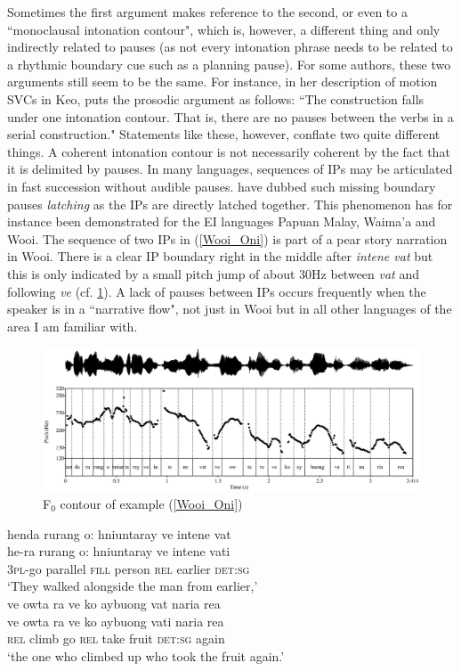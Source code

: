 Sometimes the first argument makes reference to the second, or even to a ``monoclausal intonation contour", which is, however, a different thing and only indirectly related to pauses (as not every intonation phrase needs to be related to a rhythmic boundary cue such as a planning pause). For some authors, these two arguments still seem to be the same. For instance, in her description of motion SVCs in Keo, \citet[56]{baird2008motion} puts the prosodic argument as follows: ``The construction falls under one intonation contour. That is, there are no pauses between the verbs in a serial construction." Statements like these, however, conflate two quite different things. A coherent intonation contour is not necessarily coherent by the fact that it is delimited by pauses. In many languages, sequences of IPs may be articulated in fast succession without audible pauses. \citet{himmelmann2018} have dubbed such missing boundary pauses \textit{latching} as the IPs are directly latched together. This phenomenon has for instance been demonstrated for the EI languages Papuan Malay, Waima'a and Wooi. The sequence of two IPs in (\ref{Wooi_Oni}) is part of a pear story narration in Wooi. There is a clear IP boundary right in the middle after \textit{intene vat} but this is only indicated by a small pitch jump of about 30Hz between \textit{vat} and following \textit{ve} (cf. \ref{fig:Wooi_Oni}). A lack of pauses between IPs occurs frequently when the speaker is in a ``narrative flow", not just in Wooi but in all other languages of the area I am familiar with.

\begin{figure}
\includegraphics[width=\textwidth]{figures/pearOniLATCH.eps} 
\caption{F$_0$ contour of example (\ref{Wooi_Oni})}\label{fig:Wooi_Oni}
\end{figure}

\ea \label{Wooi_Oni} 
\ea
\glll henda rurang o: hniuntaray ve intene vat \\
he-ra rurang o: hniuntaray ve intene vati \\
3\textsc{pl}-go parallel \textsc{fill} person \textsc{rel} earlier \textsc{det}:\textsc{sg} \\
\glft `They walked alongside the man from earlier,' \\ 
\ex
\glll ve owta ra ve ko aybuong vat naria rea \\ 
ve owta ra ve ko aybuong vati naria rea \\
\textsc{rel} climb go \textsc{rel} take fruit \textsc{det}:\textsc{sg} again  \\
\glft `the one who climbed up who took the fruit again.'\\ 
\z
\z


